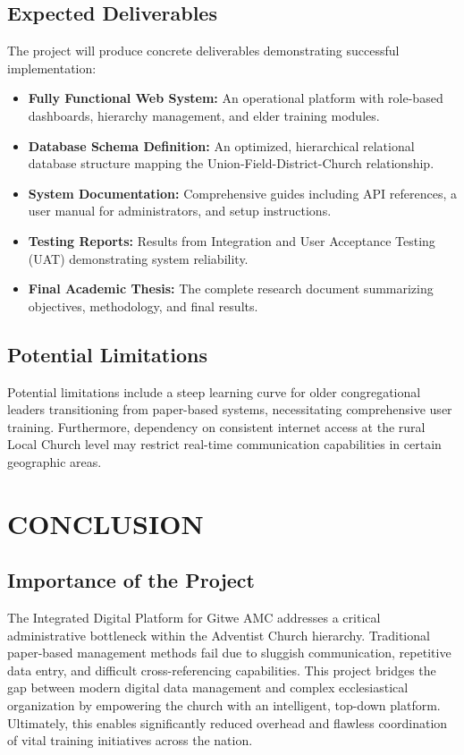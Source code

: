 \documentclass[12pt]{report}
\begin{document}
\section{Expected Deliverables}
The project will produce concrete deliverables demonstrating successful implementation:
\begin{itemize}
    \item \textbf{Fully Functional Web System:} An operational platform with role-based dashboards, hierarchy management, and elder training modules.
    \item \textbf{Database Schema Definition:} An optimized, hierarchical relational database structure mapping the Union-Field-District-Church relationship.
    \item \textbf{System Documentation:} Comprehensive guides including API references, a user manual for administrators, and setup instructions.
    \item \textbf{Testing Reports:} Results from Integration and User Acceptance Testing (UAT) demonstrating system reliability.
    \item \textbf{Final Academic Thesis:} The complete research document summarizing objectives, methodology, and final results.
\end{itemize}

\section{Potential Limitations}
Potential limitations include a steep learning curve for older congregational leaders transitioning from paper-based systems, necessitating comprehensive user training. Furthermore, dependency on consistent internet access at the rural Local Church level may restrict real-time communication capabilities in certain geographic areas.

\chapter{CONCLUSION}

\section{Importance of the Project}
The Integrated Digital Platform for Gitwe AMC addresses a critical administrative bottleneck within the Adventist Church hierarchy. Traditional paper-based management methods fail due to sluggish communication, repetitive data entry, and difficult cross-referencing capabilities. This project bridges the gap between modern digital data management and complex ecclesiastical organization by empowering the church with an intelligent, top-down platform. Ultimately, this enables significantly reduced overhead and flawless coordination of vital training initiatives across the nation.
\end{document}
